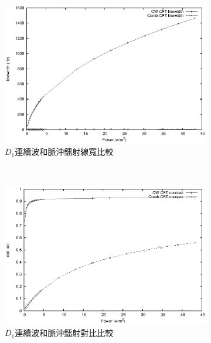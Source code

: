\documentclass[11pt,a4paper]{article}
\begin{document}
\begin{figure}
\centering
\begin{subfigure}[b]{0.6\textwidth}
\centering
\includegraphics[width=\textwidth]{d1_cw_p/linewidth.eps}
\caption{$D_1$連續波和脈沖鐳射線寬比較}
\label{fig:d1linewidth}
\end{subfigure}\\
\begin{subfigure}[b]{0.6\textwidth}
\centering
\includegraphics[width=\textwidth]{d1_cw_p/contrast.eps}
\caption{$D_1$連續波和脈沖鐳射對比比較}
\label{fig:d1contrast}
\end{subfigure}\\
\begin{subfigure}[b]{0.6\textwidth}
\centering

\end{subfigure}
\end{figure}
\end{document}
